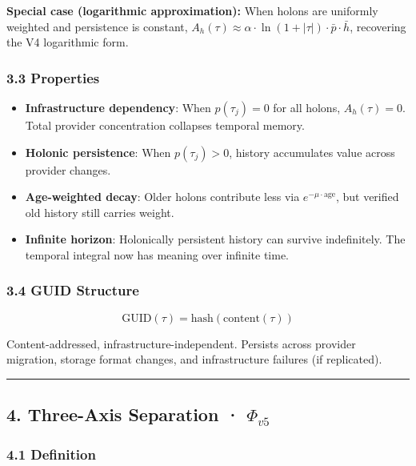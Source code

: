 \documentclass[
]{article}
\providecommand{\tightlist}{%
  \setlength{\itemsep}{0pt}\setlength{\parskip}{0pt}}
\begin{document}
\textbf{Special case (logarithmic approximation):} When holons are
uniformly weighted and persistence is constant,
\(A_h(\tau) \approx \alpha \cdot \ln(1 + |\tau|) \cdot \bar{p} \cdot \bar{h}\),
recovering the V4 logarithmic form.

\subsubsection{3.3 Properties}\label{properties}

\begin{itemize}
\tightlist
\item
  \textbf{Infrastructure dependency}: When \(p(\tau_j) = 0\) for all
  holons, \(A_h(\tau) = 0\). Total provider concentration collapses
  temporal memory.
\item
  \textbf{Holonic persistence}: When \(p(\tau_j) > 0\), history
  accumulates value across provider changes.
\item
  \textbf{Age-weighted decay}: Older holons contribute less via
  \(e^{-\mu \cdot \text{age}}\), but verified old history still carries
  weight.
\item
  \textbf{Infinite horizon}: Holonically persistent history can survive
  indefinitely. The temporal integral now has meaning over infinite
  time.
\end{itemize}

\subsubsection{3.4 GUID Structure}\label{guid-structure}

\[\text{GUID}(\tau) = \text{hash}(\text{content}(\tau))\]

Content-addressed, infrastructure-independent. Persists across provider
migration, storage format changes, and infrastructure failures (if
replicated).

\begin{center}\rule{0.5\linewidth}{0.5pt}\end{center}

\subsection{\texorpdfstring{4. Three-Axis Separation ·
\(\Phi_{v5}\)}{4. Three-Axis Separation · \textbackslash Phi\_\{v5\}}}\label{three-axis-separation-phi_v5}

\subsubsection{4.1 Definition}\label{definition-1}
\end{document}
